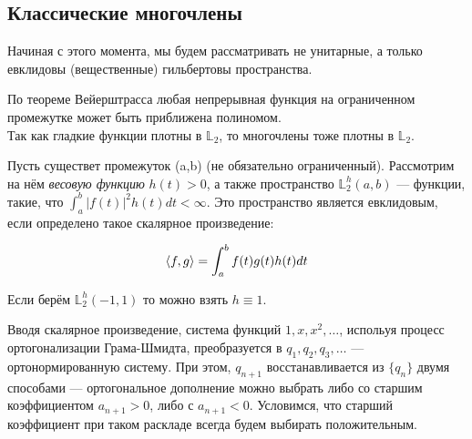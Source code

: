 \documentclass[12pt]{article}
\begin{document}
	\subsection{Классические многочлены}

		Начиная с этого момента, мы будем рассматривать не унитарные, а только евклидовы (вещественные) гильбертовы пространства.
	
		По теореме Вейерштрасса любая непрерывная функция на ограниченном промежутке может быть приближена полиномом. \\
		Так как гладкие функции плотны в $\mathbb{L}_2$, то многочлены тоже плотны в $\mathbb{L}_2$.
	
		Пусть существет промежуток (a,b) (не обязательно ограниченный). Рассмотрим на нём \textit{весовую функцию} 
		$h(t) > 0$, а также пространство
		$\mathbb{L}_2^h (a,b)$ --- функции, такие, что $\int_a^b |f(t)|^2 h(t) dt < \infty$.
		Это пространство является евклидовым, если определено такое скалярное произведение:
	
		$$ \left\langle f, g \right\rangle = \int_a^b f(t) g(t) h(t) dt $$
	
		Если берём $\mathbb{L}_2^h (-1, 1)$ то можно взять $h \equiv 1$.
	
		Вводя скалярное произведение, система функций
		$1, x, x^2, \ldots$, испольуя процесс ортогонализации Грама-Шмидта, преобразуется в $q_1, q_2, q_3, \ldots$ --- ортонормированную 
		систему. При этом, $q_{n+1}$ восстанавливается из $ \{ q_n \} $ двумя способами --- ортогональное дополнение можно выбрать либо
		со старшим коэффициентом $a_{n+1} > 0$, либо с $a_{n+1} < 0$. Условимся, что старший коэффициент при таком раскладе всегда будем 
		выбирать положительным.
	
\end{document}

